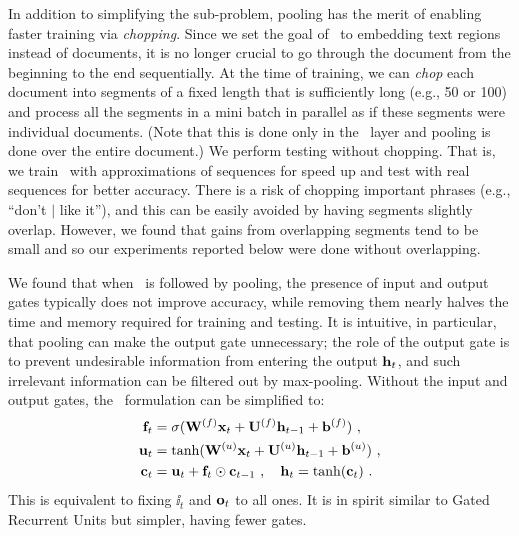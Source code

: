 \documentclass{article}
\begin{document}
In addition to simplifying the sub-problem, pooling has the merit of enabling faster training via {\em chopping}. 
Since we set the goal of \lstm\ to embedding text regions instead of documents, 
it is no longer crucial to go through the document from the beginning to the end sequentially.  
At the time of training, we can {\em chop} each document into segments of a fixed length that is sufficiently long (e.g., 50 or 100) 
and process all the segments in a mini batch in parallel as if these segments were individual documents.  
(Note that this is done only in the \lstm\ layer and pooling is done over the entire document.) 
We perform testing without chopping.  That is, we train \lstm\ with 
approximations of sequences for speed up and test with real sequences for better accuracy.  
There is a risk of chopping important phrases 
(e.g., ``don't $|$ like it''), and this can be easily avoided by having segments slightly overlap.  
However, we found that gains from overlapping segments tend to be small and so our experiments 
reported below were done without overlapping.  

We found that when \lstm\ is followed by pooling, the presence of input and output gates typically 
does not improve accuracy, while 
removing them nearly halves the time and memory required for training and testing.  
It is intuitive, in particular, that pooling can make the output gate unnecessary; 
the role of the output gate is to prevent undesirable information from entering the output ${\mathbf h}_t$, and  
such irrelevant information can be filtered out by max-pooling. 
Without the input and output gates, the \lstm\ formulation can be simplified to: 
\begin{align}
{\mathbf f}_t &= \sigma({\mathbf W}^{(f)}{\mathbf x}_t + {\mathbf U}^{(f)}{\mathbf h}_{t-1} + {\mathbf b}^{(f)} )~, \label{eq:f}\\
{\mathbf u}_t &= \tanh({\mathbf W}^{(u)}{\mathbf x}_t + {\mathbf U}^{(u)}{\mathbf h}_{t-1} + {\mathbf b}^{(u)} )~, \label{eq:u}\\
{\mathbf c}_t &= {\mathbf u}_t + {\mathbf f}_t \odot {\mathbf c}_{t-1}~,~~~{\mathbf h}_t = \tanh({\mathbf c}_t)~. \nonumber
\end{align}
This is equivalent to fixing $\ii_t$ and ${\mathbf o}_t$ to all ones.  
It is in spirit similar to Gated Recurrent Units \cite{Cho+etal14} but simpler, having fewer gates. 
\end{document}
